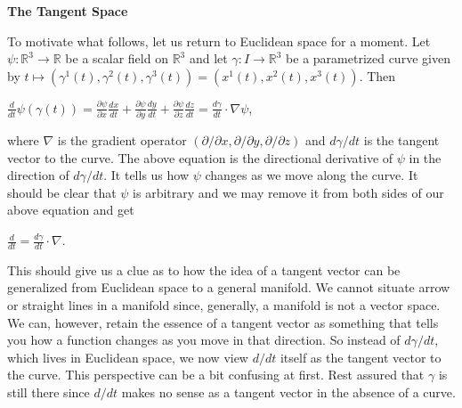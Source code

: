 \documentclass[12pt, a4paper]{article}
\begin{document}
\begin{flushleft}

    \large{\textbf{The Tangent Space}}\normalsize\par

\vspace{4mm}

    To motivate what follows, let us return to Euclidean space for a moment. Let $\psi\colon\mathbb{R}^3\rightarrow\mathbb{R}$ be a scalar field on $\mathbb{R}^3$ and let $\gamma\colon I\rightarrow\mathbb{R}^3$ be a parametrized curve given by $t\mapsto(\gamma^1(t),\gamma^2(t),\gamma^3(t))=(x^1(t),x^2(t),x^3(t))$. Then\par
    
\vspace{4mm}

        \centerline{$\frac{d}{dt}\psi(\gamma(t))=\frac{\partial\psi}{\partial x}\frac{dx}{dt}+\frac{\partial\psi}{\partial y}\frac{dy}{dt}+\frac{\partial\psi}{\partial z}\frac{dz}{dt}=\frac{d\gamma}{dt}\cdot\nabla\psi$,}
    
\vspace{4mm}

    where $\nabla$ is the gradient operator $(\partial/\partial x,\partial/\partial y,\partial/\partial z)$ and $d\gamma/dt$ is the tangent vector to the curve. The above equation is the directional derivative of $\psi$ in the direction of $d\gamma/dt$. It tells us how $\psi$ changes as we move along the curve. It should be clear that $\psi$ is arbitrary and we may remove it from both sides of our above equation and get\par
    
\vspace{4mm}

        \centerline{$\frac{d}{dt}=\frac{d\gamma}{dt}\cdot\nabla$.}        

\end{flushleft}

    This should give us a clue as to how the idea of a tangent vector can be generalized from Euclidean space to a general manifold. We cannot situate arrow or straight lines in a manifold since, generally, a manifold is not a vector space. We can, however, retain the essence of a tangent vector as something that tells you how a function changes as you move in that direction. So instead of $d\gamma/dt$, which lives in Euclidean space, we now view $d/dt$ itself as the tangent vector to the curve. This perspective can be a bit confusing at first. Rest assured that $\gamma$ is still there since $d/dt$ makes no sense as a tangent vector in the absence of a curve.\par
    
\end{document}
